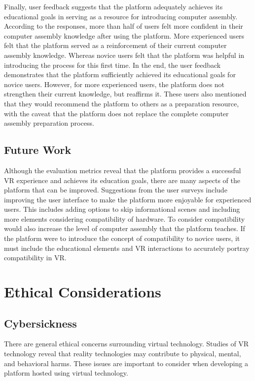 \documentclass[10pt,twocolumn]{article}
\begin{document}
\par Finally, user feedback suggests that the platform adequately achieves its educational goals in serving as a resource for introducing computer assembly. According to the responses, more than half of users felt more confident in their computer assembly knowledge after using the platform. More experienced users felt that the platform served as a reinforcement of their current computer assembly knowledge. Whereas novice users felt that the platform was helpful in introducing the process for this first time. In the end, the user feedback demonstrates that the platform sufficiently achieved its educational goals for novice users. However, for more experienced users, the platform does not strengthen their current knowledge, but reaffirms it. These users also mentioned that they would recommend the platform to others as a preparation resource, with the caveat that the platform does not replace the complete computer assembly preparation process. 

\subsection{Future Work}

\par Although the evaluation metrics reveal that the platform provides a successful VR experience and achieves its education goals, there are many aspects of the platform that can be improved. Suggestions from the user surveys include improving the user interface to make the platform more enjoyable for experienced users. This includes adding options to skip informational scenes and including more elements considering compatibility of hardware. To consider compatibility would also increase the level of computer assembly that the platform teaches. If the platform were to introduce the concept of compatibility to novice users, it must include the educational elements  and VR interactions to accurately portray compatibility in VR. 

\section{Ethical Considerations}

\subsection{Cybersickness}

\par There are general ethical concerns surrounding virtual technology. Studies of VR technology reveal that reality technologies may contribute to physical, mental, and behavioral harms. These issues are important to consider when developing a platform hosted using virtual technology. 
\end{document}
